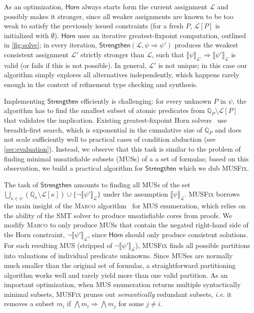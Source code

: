 \documentclass[10pt,preprint]{sigplanconf-pldi16}
\makeatletter
\theoremstyle{definition}
\newcommand{\Implies}{\Rightarrow}
\newcommand{\horn}{\mathsf{Horn}}
\newcommand{\strengthen}{\mathsf{Strengthen}}
\newcommand{\quals}{\mathbb{Q}}
\newcommand{\liquidass}{\mathcal{L}}
\newcommand{\valuation}[2]{\llbracket{#1}\rrbracket_{#2}}
\newcommand{\ie}{\textit{i.e.}\@\xspace}
\makeatother
\begin{document}
As an optimization, $\horn$ always starts form the current assignment $\liquidass$ and possibly makes it stronger, 
since all weaker assignments are known to be too weak to satisfy the previously issued constraints
(for a fresh $P$, $\liquidass[P]$ is initialized with $\emptyset$). 
$\horn$ uses an iterative greatest-fixpoint computation, outlined in \autoref{fig:solve};
in every iteration, $\strengthen(\liquidass,\psi\Implies\psi')$ produces the weakest consistent assignment $\liquidass'$ 
strictly stronger than $\liquidass$,
such that $\valuation{\psi}{\liquidass'}\Implies \valuation{\psi'}{\liquidass}$ is valid
(or fails if this is not possible).
In general, $\liquidass'$ is not unique;
in this case our algorithm simply explores all alternatives independently,
which happens rarely enough in the context of refinement type checking and synthesis.

Implementing $\strengthen$ efficiently is challenging:
for every unknown $P$ in $\psi$,
the algorithm has to find the smallest subset of atomic predicates from 
$\quals_{P}\setminus\liquidass[P]$ that validates the implication.
Existing greatest-fixpoint Horn solvers~\cite{SrivastavaGu09} use breadth-first search,
which is exponential in the cumulative size of $\quals_P$
and does not scale sufficiently well to practical cases of condition abduction (see \autoref{sec:evaluation}).
Instead, we observe that this task is similar to the problem of finding minimal unsatisfiable subsets (MUSs) of a a set of formulas;
based on this observation, we build a practical algorithm for $\strengthen$ which we dub \textsc{MUSFix}.

The task of $\strengthen$ amounts to finding all MUSs of the set
$\bigcup_{\kappa\in\psi}(\quals_{\kappa}\setminus\liquidass[\kappa]) \cup \{\neg\valuation{\psi'}{\liquidass}\}$
under the assumption $\valuation{\psi}{\liquidass}$.
\textsc{MUSFix} borrows the main insight of the \textsc{Marco} algorithm~\cite{LiffitonPrMaMa15} for MUS enumeration,
which relies on the ability of the SMT solver to produce unsatisfiable cores from proofs.
We modify \textsc{Marco} to only produce MUSs 
that contain the negated right-hand side of the Horn constraint, $\neg\valuation{\psi'}{\liquidass}$,
since $\horn$ should only produce consistent solutions.
For each resulting MUS (stripped of $\neg\valuation{\psi'}{\liquidass}$),
\textsc{MUSFix} finds all possible partitions into valuations of individual predicate unknowns.
Since MUSes are normally much smaller than the original set of formulas, 
a straightforward partitioning algorithm works well and rarely yield more than one valid partition.
As an important optimization,
when MUS enumeration returns multiple syntactically minimal subsets,
\textsc{MUSFix} prunes out \emph{semantically} redundant subsets,
\ie it removes a subset $m_i$ if $\bigwedge m_i \Implies \bigwedge m_j$ for some $j \neq i$.
\end{document}
